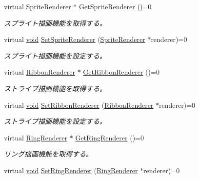 \begin{DoxyCompactItemize}
virtual \mbox{\hyperlink{class_effekseer_1_1_sprite_renderer}{Sprite\+Renderer}} $\ast$ \mbox{\hyperlink{class_effekseer_1_1_manager_a64de7501affd3c08106b0442a4e2a76c}{Get\+Sprite\+Renderer}} ()=0
\begin{DoxyCompactList}\small\item\em スプライト描画機能を取得する。 \end{DoxyCompactList}\item 
virtual \mbox{\hyperlink{namespace_effekseer_ab34c4088e512200cf4c2716f168deb56}{void}} \mbox{\hyperlink{class_effekseer_1_1_manager_a1b4f22221e7068d6604c18aa4ca4b80e}{Set\+Sprite\+Renderer}} (\mbox{\hyperlink{class_effekseer_1_1_sprite_renderer}{Sprite\+Renderer}} $\ast$renderer)=0
\begin{DoxyCompactList}\small\item\em スプライト描画機能を設定する。 \end{DoxyCompactList}\item 
virtual \mbox{\hyperlink{class_effekseer_1_1_ribbon_renderer}{Ribbon\+Renderer}} $\ast$ \mbox{\hyperlink{class_effekseer_1_1_manager_a9173c3b04e430de83f5096fe28cff9e1}{Get\+Ribbon\+Renderer}} ()=0
\begin{DoxyCompactList}\small\item\em ストライプ描画機能を取得する。 \end{DoxyCompactList}\item 
virtual \mbox{\hyperlink{namespace_effekseer_ab34c4088e512200cf4c2716f168deb56}{void}} \mbox{\hyperlink{class_effekseer_1_1_manager_afe6fa26d93c9c80a0afb8f4fbe0afe20}{Set\+Ribbon\+Renderer}} (\mbox{\hyperlink{class_effekseer_1_1_ribbon_renderer}{Ribbon\+Renderer}} $\ast$renderer)=0
\begin{DoxyCompactList}\small\item\em ストライプ描画機能を設定する。 \end{DoxyCompactList}\item 
virtual \mbox{\hyperlink{class_effekseer_1_1_ring_renderer}{Ring\+Renderer}} $\ast$ \mbox{\hyperlink{class_effekseer_1_1_manager_a20dcb7324f1b4137cbcd872cfd90def2}{Get\+Ring\+Renderer}} ()=0
\begin{DoxyCompactList}\small\item\em リング描画機能を取得する。 \end{DoxyCompactList}\item 
virtual \mbox{\hyperlink{namespace_effekseer_ab34c4088e512200cf4c2716f168deb56}{void}} \mbox{\hyperlink{class_effekseer_1_1_manager_afe6f77af79fd2bea3a36eed5b5dea383}{Set\+Ring\+Renderer}} (\mbox{\hyperlink{class_effekseer_1_1_ring_renderer}{Ring\+Renderer}} $\ast$renderer)=0

\end{DoxyCompactItemize}
